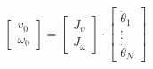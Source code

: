 \vspace{-0.5em}
$$
    \begin{bmatrix}
        v_0 \\ \omega_0
    \end{bmatrix}
    = 
    \begin{bmatrix}
        J_v \\ J_\omega
    \end{bmatrix}
    \cdot 
    \begin{bmatrix}
        \dot{\theta}_1 \\ \vdots \\ \dot{\theta}_N
    \end{bmatrix}
$$